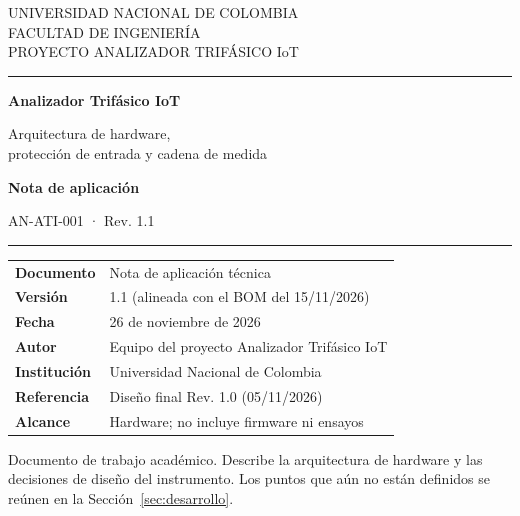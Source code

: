 \documentclass[11pt,a4paper]{article}
\begin{document}
\begin{titlepage}
\thispagestyle{empty}
\begin{flushleft}
{\sffamily\small\color{unalgray}UNIVERSIDAD NACIONAL DE COLOMBIA}\\[2pt]
{\sffamily\small\color{unalgray}FACULTAD DE INGENIERÍA}\\[2pt]
{\sffamily\small\color{unalgray}PROYECTO ANALIZADOR TRIFÁSICO IoT}
\end{flushleft}

\vspace{1.1cm}
{\color{unalblue}\rule{\textwidth}{2.5pt}}
\vspace{0.9cm}

{\sffamily\Huge\bfseries\color{unalblue} Analizador Trifásico IoT\par}
\vspace{0.55cm}
{\sffamily\LARGE Arquitectura de hardware,\\ protección de entrada y cadena de medida\par}
\vspace{0.9cm}
{\sffamily\large\bfseries Nota de aplicación\par}
{\sffamily\large AN-ATI-001 · Rev. 1.1\par}
\vspace{0.35cm}
{\color{unalblue}\rule{\textwidth}{0.8pt}}

\vfill

\begin{tabularx}{\textwidth}{@{}>{\bfseries}p{4.3cm}X@{}}
Documento & Nota de aplicación técnica \\
Versión & 1.1 (alineada con el BOM del 15/11/2026) \\
Fecha & 26 de noviembre de 2026 \\
Autor & Equipo del proyecto Analizador Trifásico IoT \\
Institución & Universidad Nacional de Colombia \\
Referencia & Diseño final Rev. 1.0 (05/11/2026) \\
Alcance & Hardware; no incluye firmware ni ensayos \\
\end{tabularx}

\vspace{0.9cm}
{\footnotesize\color{unalgray}
Documento de trabajo académico. Describe la arquitectura de hardware y las
decisiones de diseño del instrumento. Los puntos que aún no están definidos se
reúnen en la Sección~\ref{sec:desarrollo}.}
\end{titlepage}
\end{document}
